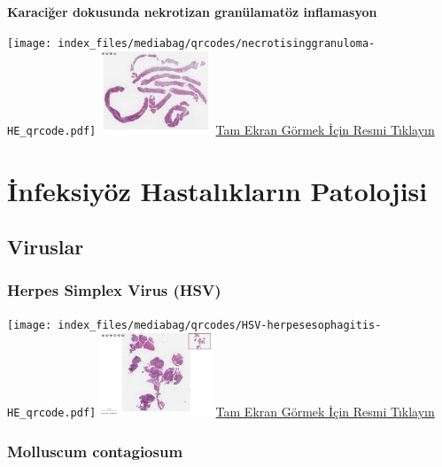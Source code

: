 \documentclass[
  letterpaper,
  DIV=11,
  numbers=noendperiod]{scrreprt}
\begin{document}
\textbf{Karaciğer dokusunda nekrotizan granülamatöz inflamasyon}

\texttt{[image: index\_files/mediabag/qrcodes/necrotisinggranuloma-HE\_qrcode.pdf]}
\href{https://images.patolojiatlasi.com/necrotisinggranuloma/HE.html}{\includegraphics[width=0.25\textwidth,height=\textheight]{./screenshots/thumbnail_necrotisinggranuloma.png}}
\href{https://images.patolojiatlasi.com/necrotisinggranuloma/HE.html}{Tam
Ekran Görmek İçin Resmi Tıklayın}

\part{İnfeksiyöz Hastalıkların Patolojisi}

\hypertarget{sec-viruslar}{%
\chapter{Viruslar}\label{sec-viruslar}}

\hypertarget{sec-herpes-simplex-virus}{%
\section{Herpes Simplex Virus (HSV)}\label{sec-herpes-simplex-virus}}

\texttt{[image: index\_files/mediabag/qrcodes/HSV-herpesesophagitis-HE\_qrcode.pdf]}
\href{https://images.patolojiatlasi.com/HSV/herpesesophagitis/viewer_z0.html}{\includegraphics[width=0.25\textwidth,height=\textheight]{./screenshots/thumbnail_herpesesophagitis.png}}
\href{https://images.patolojiatlasi.com/HSV/herpesesophagitis/viewer_z0.html}{Tam
Ekran Görmek İçin Resmi Tıklayın}

\hypertarget{sec-molluscum-contagiosum}{%
\section{Molluscum contagiosum}\label{sec-molluscum-contagiosum}}
\end{document}
